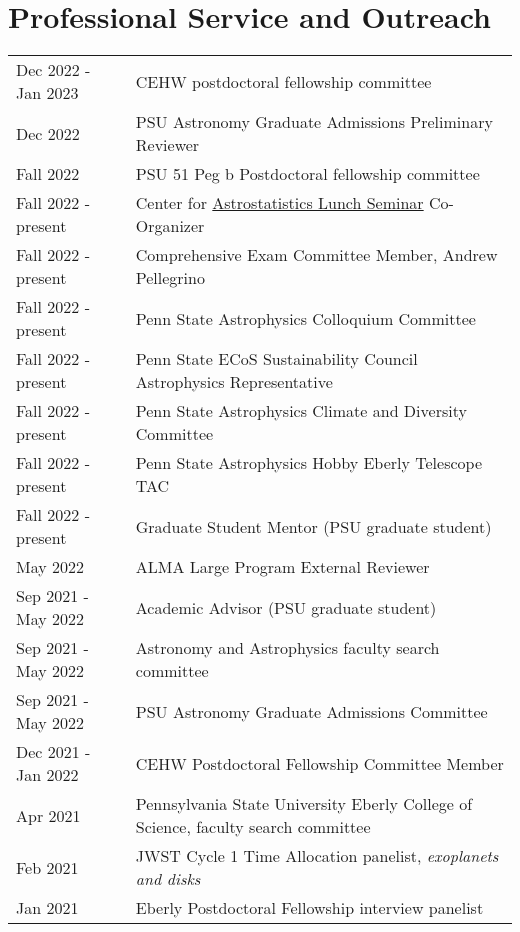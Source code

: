\section*{Professional Service and Outreach}
\begin{tabular*}{\textwidth}{@{\hspace{10pt}}p{1.4in}l}
Dec 2022 - Jan 2023 & CEHW postdoctoral fellowship committee \\
Dec 2022 & PSU Astronomy Graduate Admissions Preliminary Reviewer \\
Fall 2022 & PSU 51 Peg b Postdoctoral fellowship committee \\
Fall 2022 - present & Center for \href{https://sites.psu.edu/astrostatistics/cast-lunch-meetings/}{Astrostatistics Lunch Seminar} Co-Organizer \\
Fall 2022 - present & Comprehensive Exam Committee Member, Andrew Pellegrino \\    
Fall 2022 - present & Penn State Astrophysics Colloquium Committee \\
Fall 2022 - present & Penn State ECoS Sustainability Council Astrophysics Representative \\
Fall 2022 - present & Penn State Astrophysics Climate and Diversity Committee \\
Fall 2022 - present & Penn State Astrophysics Hobby Eberly Telescope TAC \\
Fall 2022 - present & Graduate Student Mentor (PSU graduate student) \\ %
May 2022 & ALMA Large Program External Reviewer \\
Sep 2021 - May 2022 & Academic Advisor (PSU graduate student) \\ %
Sep 2021 - May 2022 & Astronomy and Astrophysics faculty search committee\\
Sep 2021 - May 2022 & PSU Astronomy Graduate Admissions Committee \\ 
Dec 2021 - Jan 2022 & CEHW Postdoctoral Fellowship Committee Member \\
Apr 2021 & Pennsylvania State University Eberly College of Science, faculty search committee\\
Feb 2021 & JWST Cycle 1 Time Allocation panelist, \emph{exoplanets and disks}\\
Jan 2021 & Eberly Postdoctoral Fellowship interview panelist\\

\end{tabular*}
